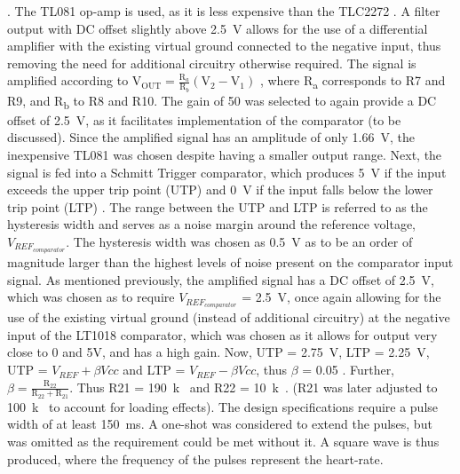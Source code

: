 \cite{filter}. The TL081 op-amp is used, as it is less expensive than the TLC2272 \cite{octo}. A filter output with DC offset slightly above \SI{2.5}{V} allows for the use of a differential amplifier with the existing virtual ground connected to the negative input, thus removing the need for additional circuitry otherwise required. The signal is amplified according to $\mathrm{V}_{\mathrm{OUT}}=\frac{\mathrm{R}_{a}}{\mathrm{R}_{b}}\left(\mathrm{V}_{2}-\mathrm{V}_{1}\right)$ \cite{opamp}, where R\textsubscript{a} corresponds to R7 and R9, and R\textsubscript{b} to R8 and R10. The gain of 50 was selected to again provide a DC offset of \SI{2.5}{V}, as it facilitates implementation of the comparator (to be discussed). Since the amplified signal has an amplitude of only \SI{1.66}{V}, the inexpensive TL081 was chosen despite having a smaller output range. Next, the signal is fed into a Schmitt Trigger comparator, which produces \SI{5}{V} if the input exceeds the upper trip point (UTP) and \SI{0}{V} if the input falls below the lower trip point (LTP) \cite{schmitt}. The range between the UTP and LTP is referred to as the hysteresis width and serves as a noise margin \cite{schmitt} around the reference voltage, $V_{REF_{comparator}}$. The hysteresis width was chosen as \SI{0.5}{V} as to be an order of magnitude larger than the highest levels of noise present on the comparator input signal. As mentioned previously, the amplified signal has a DC offset of \SI{2.5}{V}, which was chosen as to require $V_{REF_{comparator}}$ = \SI{2.5}{V}, once again allowing for the use of the existing virtual ground (instead of additional circuitry) at the negative input of the LT1018 comparator, which was chosen as it allows for output very close to 0 and 5V, and has a high gain. Now, UTP = \SI{2.75}{V}, LTP = \SI{2.25}{V}, UTP = $V_{REF} + \beta Vcc$ and LTP = $V_{REF} - \beta Vcc$, thus $\beta$ = 0.05 \cite{schmitt}. Further, $\beta=\frac{\mathrm{R}_{22}}{\mathrm{R}_{22}+\mathrm{R}_{21}}$. Thus R21 = \SI{190}{k\Omega} and R22 = \SI{10}{k\Omega}. (R21 was later adjusted to \SI{100}{k\Omega} to account for loading effects). The design specifications require a pulse width of at least \SI{150}{ms}. A one-shot was considered to extend the pulses, but was omitted as the requirement could be met without it. A square wave is thus produced, where the frequency of the pulses represent the heart-rate.\\


